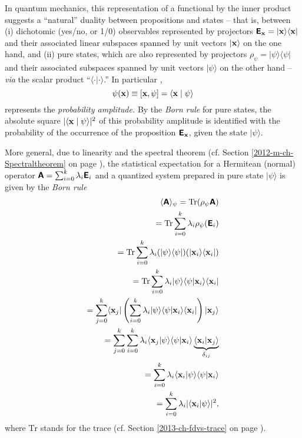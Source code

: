 {\color{Purple}
In quantum mechanics,
this representation of a functional by the inner product suggests a ``natural'' duality between
propositions and states
--
that is, between (i)
dichotomic (yes/no, or 1/0) observables
represented by projectors $\textsf{\textbf{E}}_{\bf x}= \vert {\bf x} \rangle \langle {\bf x} \vert$
and their associated linear subspaces  spanned by unit vectors  $\vert {\bf x} \rangle $
on the one hand,
and (ii) pure states, which are also represented by projectors $\rho_{\psi}= \vert \psi \rangle \langle \psi \vert$
and their associated subspaces spanned by unit vectors  $ \vert {\psi} \rangle$
on the other hand
--
{\em via} the scalar product ``$\langle \cdot \vert \cdot \rangle$.''
In particular \cite{hamhalter-book},
\begin{equation}
{{\psi}} ({\bf x}) \equiv [{\bf x},  \psi ]= \langle {\bf x} \mid \psi \rangle
\end{equation}
represents the {\em probability amplitude.}
By the {\em Born rule}
for pure states,
the absolute square $\vert \langle {\bf x} \mid \psi \rangle \vert^2$
of this probability amplitude is identified with the probability of the occurrence of the proposition
$\textsf{\textbf{E}}_{\bf x}$,
given the state  $ \vert {\psi} \rangle$.

More general,  due to linearity and the spectral theorem
(cf. Section \ref{2012-m-ch-Spectraltheorem} on page \pageref{2012-m-ch-Spectraltheorem}),
the statistical expectation for a Hermitean (normal) operator $\textsf{\textbf{A}}=
\sum_{i=0}^k   \lambda_i \textsf{\textbf{E}}_i$
and a quantized system prepared in pure state $ \vert {\psi}\rangle$
is given by the {\em Born rule}
\begin{equation}
\begin{split}
\langle \textsf{\textbf{A}}\rangle_{\psi} = \text{Tr} ({\rho_{\psi}} \textsf{\textbf{A}})\\
=
\text{Tr}  \sum_{i=0}^k   \lambda_i {\rho_{\psi}} (\textsf{\textbf{E}}_i) \\
=
 \text{Tr} \sum_{i=0}^k   \lambda_i (\vert \psi \rangle \langle \psi \vert )( \vert {\bf x}_i \rangle \langle {\bf x}_i \vert )\\
=
 \text{Tr} \sum_{i=0}^k   \lambda_i  \vert \psi \rangle \langle \psi \vert   {\bf x}_i \rangle \langle {\bf x}_i \vert  \\
=
\sum_{j=0}^k \langle {\bf x}_j \vert
\left(  \sum_{i=0}^k   \lambda_i  \vert \psi \rangle  \langle \psi   \vert {\bf x}_i \rangle   \langle {\bf x}_i \vert \right)   \vert{\bf x}_j \rangle    \\
=
\sum_{j=0}^k
   \sum_{i=0}^k   \lambda_i  \langle {\bf x}_j \vert \psi \rangle   \langle \psi   \vert {\bf x}_i \rangle
\underbrace{ \langle {\bf x}_i \vert    {\bf x}_j \rangle }_{\delta_{ij}}  \\
=
\sum_{i=0}^k   \lambda_i  \langle {\bf x}_i \vert \psi \rangle \langle \psi   \vert {\bf x}_i \rangle
\\
=
\sum_{i=0}^k   \lambda_i \vert \langle {\bf x}_i \vert \psi \rangle \vert^2,
\end{split}
\end{equation}
where $\text{Tr}$ stands for the trace (cf. Section \ref{2013-ch-fdvs-trace} on page \pageref{2013-ch-fdvs-trace}).
}


